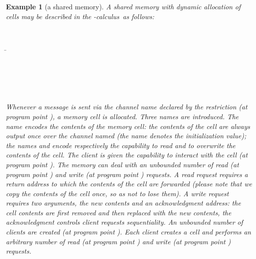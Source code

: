 \documentclass{article}
\newtheorem{example}[thm]{Example}
\newcommand{\picalcul}{-calculus}
\newcommand{\pp}[1]{}
\newcommand{\pps}[1]{(at program point \pp{#1})}
\newcommand{\memlaba}{1}
\newcommand{\memlabc}{3}
\newcommand{\memlabd}{4}
\newcommand{\memlabh}{8}
\newcommand{\memlabk}{11}
\newcommand{\memlabo}{15}
\newcommand{\memlabr}{18}
\begin{document}
{
\begin{example}[a shared memory]
\label{memory}
A shared memory with dynamic allocation of cells may be described  
in the \picalcul\ as follows:
\begin{tabbing}
\\
\;\=\\
\>\=\;\\
\>\\
\>\\
\\
\>\\
\>
\end{tabbing}
Whenever a message is sent via the channel name declared by the restriction  \pps{\memlaba}, a memory cell is allocated.
Three names are introduced. The name  encodes the contents of the memory cell: the contents of the cell are always output once over the channel named  (the name  denotes the initialization value); the names  and  encode respectively the capability to read and to overwrite the contents of the cell. 
The client is given the capability to interact with the cell \pps{\memlabc}.
The memory can deal with an unbounded number of read \pps{\memlabd} and write \pps{\memlabh} requests. 
A read request requires a return address to which the contents of the cell are forwarded (please note that we copy the contents of the cell once, so as not to lose them). 
A write request requires two arguments, the new contents and an acknowledgment address: the cell contents  are first removed and then replaced with  the new contents, the acknowledgment controls client requests sequentiality. 
An unbounded number of clients are created \pps{\memlabk}.
Each client creates a cell and performs an arbitrary number of read \pps{\memlabo} and write \pps{\memlabr} requests.


\end{example}}
\end{document}
